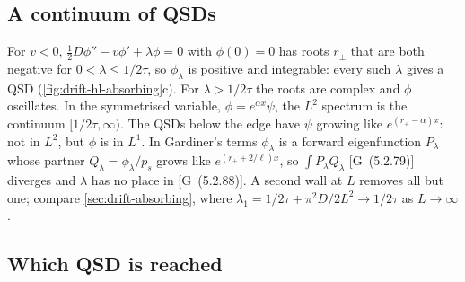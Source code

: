 \documentclass[11pt]{article}
\numberwithin{equation}{section}
\newcommand{\G}[1]{[G~(#1)]}
\begin{document}
\subsection{A continuum of QSDs}

For $v<0$, $\tfrac12D\phi''-v\phi'+\lambda\phi=0$ with $\phi(0)=0$ has roots $r_\pm$ that are both
negative for $0<\lambda\le1/2\tau$, so $\phi_\lambda$ is positive and integrable: every such $\lambda$ gives a
QSD (\cref{fig:drift-hl-absorbing}c). For $\lambda>1/2\tau$ the roots are complex and $\phi$ oscillates. In
the symmetrised variable, $\phi=e^{\alpha x}\psi$, the $L^2$ spectrum is the continuum $[1/2\tau,\infty)$.
The QSDs below the edge have $\psi$ growing like $e^{(r_+-\alpha)x}$: not in $L^2$, but $\phi$ is in $L^1$. In
Gardiner's terms $\phi_\lambda$ is a forward eigenfunction $P_\lambda$ whose partner $Q_\lambda=\phi_\lambda/p_s$
grows like $e^{(r_++2/\ell)x}$, so $\int P_\lambda Q_\lambda$ \G{5.2.79} diverges and $\lambda$ has no place in
\G{5.2.88}. A
second wall at $L$ removes all but one; compare \cref{sec:drift-absorbing}, where
$\lambda_1=1/2\tau+\pi^2D/2L^2\to1/2\tau$ as $L\to\infty$.

\subsection{Which QSD is reached}
\end{document}
